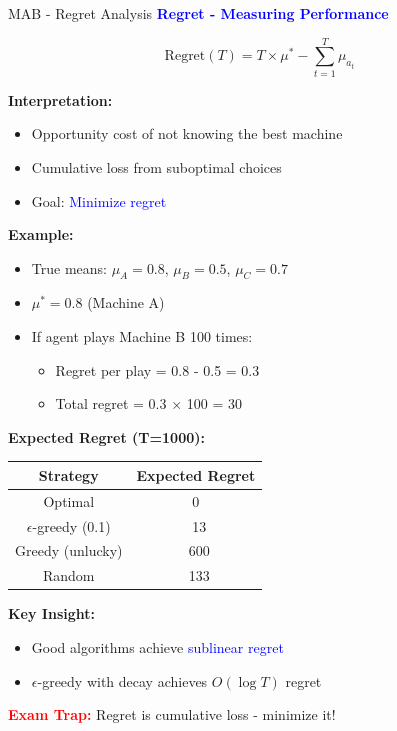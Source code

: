 \documentclass[8pt]{beamer}
\begin{document}
\begin{frame}{MAB - Regret Analysis}
\fontsize{6.5}{7.5}\selectfont
\textcolor{blue}{\textbf{Regret - Measuring Performance}}

\[
\text{Regret}(T) = T \times \mu^* - \sum_{t=1}^T \mu_{a_t}
\]

\textbf{Interpretation:}
\begin{itemize}
\item Opportunity cost of not knowing the best machine
\item Cumulative loss from suboptimal choices
\item Goal: \textcolor{blue}{Minimize regret}
\end{itemize}

\textbf{Example:}
\begin{itemize}
\item True means: $\mu_A = 0.8$, $\mu_B = 0.5$, $\mu_C = 0.7$
\item $\mu^* = 0.8$ (Machine A)
\item If agent plays Machine B 100 times:
\begin{itemize}
\item Regret per play = 0.8 - 0.5 = 0.3
\item Total regret = 0.3 $\times$ 100 = 30
\end{itemize}
\end{itemize}

\textbf{Expected Regret (T=1000):}
\begin{tabular}{|c|c|}
\hline
Strategy & Expected Regret \\
\hline
Optimal & 0 \\
\hline
$\epsilon$-greedy (0.1) & ~13 \\
\hline
Greedy (unlucky) & ~600 \\
\hline
Random & ~133 \\
\hline
\end{tabular}

\textbf{Key Insight:}
\begin{itemize}
\item Good algorithms achieve \textcolor{blue}{sublinear regret}
\item $\epsilon$-greedy with decay achieves $O(\log T)$ regret
\end{itemize}

\textcolor{red}{\textbf{Exam Trap:}} Regret is cumulative loss - minimize it!
\end{frame}
\end{document}
